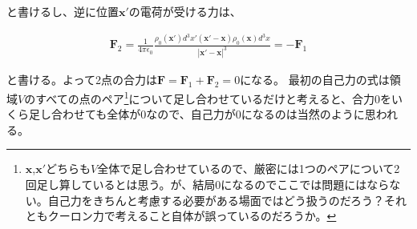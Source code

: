 \documentclass[a4j,12pt,uplatex,dvipdfmx]{jsreport}
\begin{document}
と書けるし、逆に位置$\bm{x'}$の電荷が受ける力は、

\begin{eqnarray*}
    \bm{F}_2 = \frac{1}{4 \pi \epsilon_0}  \frac{\rho_0(\bm{x'}) d^3 x' (\bm{x'} - \bm{x}) \rho_0(\bm{x}) d^3 x}{| \bm{x'} - \bm{x} |^3} = - \bm{F}_1
\end{eqnarray*}

と書ける。よって2点の合力は$\bm{F} = \bm{F}_1 + \bm{F}_2 = 0$になる。
最初の自己力の式は領域$V$のすべての点のペア\footnote{$\bm{x}$,$\bm{x'}$どちらも$V$全体で足し合わせているので、厳密には1つのペアについて2回足し算しているとは思う。が、結局$0$になるのでここでは問題にはならない。自己力をきちんと考慮する必要がある場面ではどう扱うのだろう？それともクーロン力で考えること自体が誤っているのだろうか。}について足し合わせているだけと考えると、合力$0$をいくら足し合わせても全体が$0$なので、自己力が$0$になるのは当然のように思われる。
\end{document}
